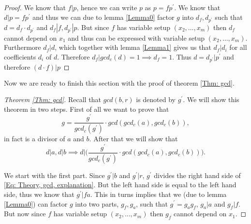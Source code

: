 \begin{proof}
  We know that $f|p$, hence we can write $p$ as $p=fp^\prime$. We know that $d|p=fp^\prime$ and thus we can due to lemma \ref{Lemma0} factor $g$ into $d_f,d_{p^\prime}$ such that $d=d_f\cdot d_{p^\prime}$ and $d_f|f,d_{p^\prime}|p$. But since $f$ has variable setup $(x_2,\ldots,x_m)$ then $d_f$ cannot depend on $x_1$ and thus can be expressed with variable setup $(x_2,\ldots,x_m)$. Furthermore $d_f|d$, which together with lemma \ref{Lemma1} gives us that $d_f|d_i$ for all coefficients $d_i$ of $d$. Therefore $d_f|gcd_c(d)=1\implies d_f=1$. Thus $d=d_{p^\prime}|p^\prime$ and therefore $(d\cdot f)|p$
\end{proof}
Now we are ready to finish this section with the proof of theorem \ref{Thm: gcd}.
\begin{proof}[Theorem \ref{Thm: gcd}]
  Recall that $gcd(b,r)$ is denoted by $g^\prime$. We will show this theorem in two steps. First of all we want to prove that
  \begin{equation}
    g=\frac{g^\prime}{gcd_c(g^\prime)}\cdot gcd(gcd_c(a),gcd_c(b)),
  \end{equation}
  in fact is a divisor of $a$ and $b$. After that we will show that
  \begin{equation}
    d|a, d|b \implies d\Big|\Big(\frac{g^\prime}{gcd_c(g^\prime)}\cdot gcd(gcd_c(a),gcd_c(b))\Big).
  \end{equation}

  We start with the first part. Since $g^\prime|b$ and $g^\prime|r$, $g^\prime$ divides the right hand side of \eqref{Eq: Theory, gcd, explanation}. But the left hand side is equal to the left hand side, thus we know that $g^\prime|fa$. This in turns implies that we (due to lemma \ref{Lemma0}) can factor $g$ into two parts, $g_f,g_a$, such that $g^\prime=g_ag_f$, $g_a|a$ and $g_f|f$. But now since $f$ has variable setup $(x_2,\ldots,x_m)$ then $g_f$ cannot depend on $x_1$.


\end{proof}
